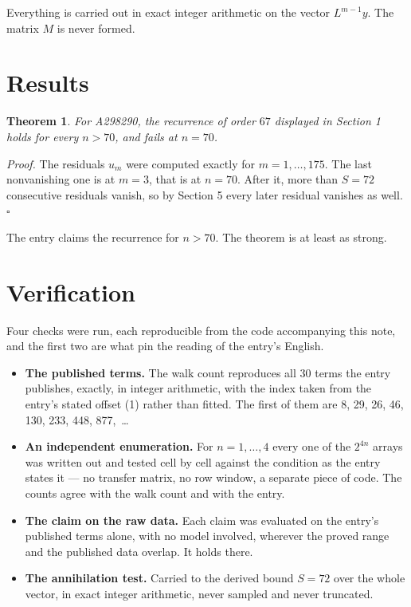 \documentclass[11pt]{article}
\newtheorem{theorem}{Theorem}
\theoremstyle{definition}
\begin{document}
Everything is carried out in exact integer arithmetic on the vector $L^{m-1}y$. The matrix $M$ is never formed.

\section{Results}

\begin{theorem} For A298290, the recurrence of order $67$ displayed in Section 1 holds for every $n > 70$, and fails at $n = 70$.\end{theorem}

{\itshape Proof.} The residuals $u_m$ were computed exactly for $m = 1,\dots,175$. The last nonvanishing one is at $m = 3$, that is at $n = 70$. After it, more than $S = 72$ consecutive residuals vanish, so by Section 5 every later residual vanishes as well. $\square$

The entry claims the recurrence for $n > 70$. The theorem is at least as strong.

\section{Verification}

Four checks were run, each reproducible from the code accompanying this note, and the first two are what pin the reading of the entry's English.

\begin{itemize}

\item {\bfseries The published terms.} The walk count reproduces all 30 terms the entry publishes, exactly, in integer arithmetic, with the index taken from the entry's stated offset (1) rather than fitted. The first of them are 8, 29, 26, 46, 130, 233, 448, 877,~\dots

\item {\bfseries An independent enumeration.} For $n = 1,\dots,4$ every one of the $2^{4n}$ arrays was written out and tested cell by cell against the condition as the entry states it --- no transfer matrix, no row window, a separate piece of code. The counts agree with the walk count and with the entry.

\item {\bfseries The claim on the raw data.} Each claim was evaluated on the entry's published terms alone, with no model involved, wherever the proved range and the published data overlap. It holds there.

\item {\bfseries The annihilation test.} Carried to the derived bound $S = 72$ over the whole vector, in exact integer arithmetic, never sampled and never truncated.

\end{itemize}
\end{document}
